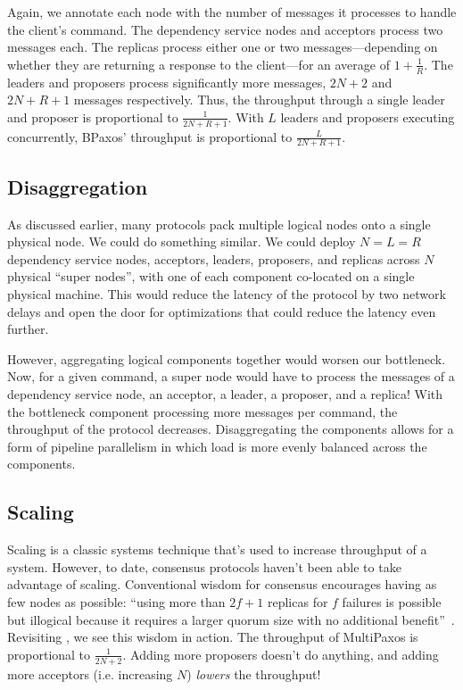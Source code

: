 {}

Again, we annotate each node with the number of messages it processes to handle
the client's command. The dependency service nodes and acceptors process two
messages each. The replicas process either one or two messages---depending on
whether they are returning a response to the client---for an average of
$1+\frac{1}{R}$. The leaders and proposers process significantly more messages,
$2N+2$ and $2N+R+1$ messages respectively. Thus, the throughput through a
single leader and proposer is proportional to $\frac{1}{2N+R+1}$. With $L$
leaders and proposers executing concurrently, BPaxos' throughput is
proportional to $\frac{L}{2N+R+1}$.

\subsection{Disaggregation}
As discussed earlier, many protocols pack multiple logical nodes onto a single
physical node. We could do something similar. We could deploy $N=L=R$
dependency service nodes, acceptors, leaders, proposers, and replicas across
$N$ physical ``super nodes'', with one of each component co-located on a single
physical machine. This would reduce the latency of the protocol by two network
delays and open the door for optimizations that could reduce the latency even
further.

However, aggregating logical components together would worsen our bottleneck.
Now, for a given command, a super node would have to process the messages of a
dependency service node, an acceptor, a leader, a proposer, and a replica! With
the bottleneck component processing more messages per command, the throughput
of the protocol decreases. Disaggregating the components allows for a form of
pipeline parallelism in which load is more evenly balanced across the
components.

\subsection{Scaling}
Scaling is a classic systems technique that's used to increase throughput of a
system. However, to date, consensus protocols haven't been able to take
advantage of scaling. Conventional wisdom for consensus encourages having as
few nodes as possible: ``using more than $2f+1$ replicas for $f$ failures is
possible but illogical because it requires a larger quorum size with no
additional benefit''~\cite{zhang2018building}. Revisiting
, we see this wisdom in action. The throughput of
MultiPaxos is proportional to $\frac{1}{2N+2}$. Adding more proposers doesn't
do anything, and adding more acceptors (i.e. increasing $N$) \emph{lowers} the
throughput!

